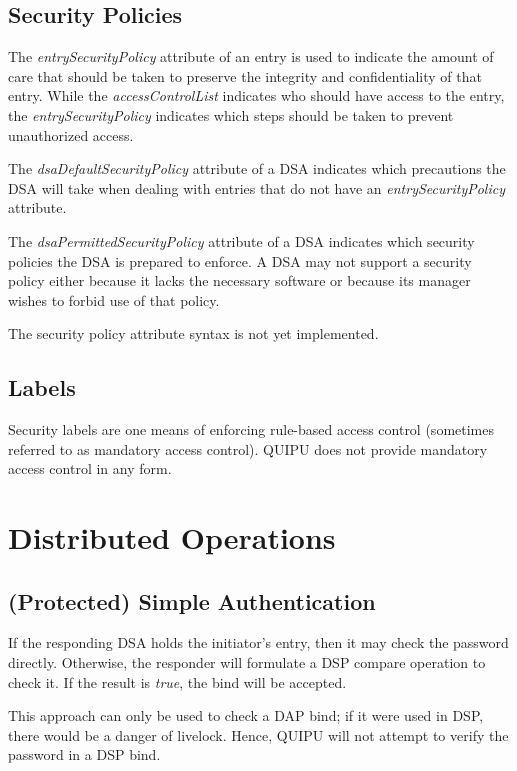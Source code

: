 \subsection{Security Policies}

The {\em entrySecurityPolicy} attribute of an entry is used to indicate the
amount of care that should be taken to preserve the integrity and
confidentiality of that entry. While the {\em accessControlList} indicates
who should have access to the entry, the {\em entrySecurityPolicy} indicates
which steps should be taken to prevent unauthorized access.

The {\em dsaDefaultSecurityPolicy} attribute of a DSA indicates which
precautions the DSA will take when dealing with entries that do not have
an {\em entrySecurityPolicy} attribute.

The {\em dsaPermittedSecurityPolicy} attribute of a DSA indicates which
security policies the DSA is prepared to enforce. A DSA may not support a
security policy either because it lacks the necessary software or
because its manager wishes to forbid use of that policy.

The security policy attribute syntax is not yet implemented.

\subsection{Labels}

Security labels are one means of enforcing rule-based access control
(sometimes referred to as mandatory access control). QUIPU does not
provide mandatory access control in any form.

\section{Distributed Operations}
\label{des-auth}

\subsection{(Protected) Simple Authentication}

If the responding DSA holds the initiator's entry, then it may check the
password directly. Otherwise, the responder will formulate a DSP compare
operation to check it. If the result is {\em true}, the bind will be
accepted.

This approach can only be used to check a DAP bind; if it were used in DSP,
there would be a danger of livelock. Hence, QUIPU will not attempt to
verify the password in a DSP bind.


